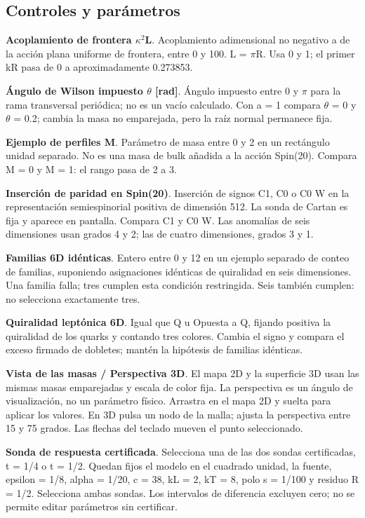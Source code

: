 \documentclass[11pt,a4paper]{article}
\begin{document}
\subsection*{Controles y parámetros}
\textbf{Acoplamiento de frontera \ensuremath{\kappa}\ensuremath{{}^{2}}L}. Acoplamiento adimensional no negativo a de la acción plana uniforme de frontera, entre 0 y 100. L = \ensuremath{\pi}R. Usa 0 y 1; el primer kR pasa de 0 a aproximadamente 0.273853.

\textbf{Ángulo de Wilson impuesto \ensuremath{\theta} [rad]}. Ángulo impuesto entre 0 y \ensuremath{\pi} para la rama transversal periódica; no es un vacío calculado. Con a = 1 compara \ensuremath{\theta} = 0 y \ensuremath{\theta} = 0.2; cambia la masa no emparejada, pero la raíz normal permanece fija.

\textbf{Ejemplo de perfiles M}. Parámetro de masa entre 0 y 2 en un rectángulo unidad separado. No es una masa de bulk añadida a la acción Spin(20). Compara M = 0 y M = 1: el rango pasa de 2 a 3.

\textbf{Inserción de paridad en Spin(20)}. Inserción de signos C1, C0 o C0 W en la representación semiespinorial positiva de dimensión 512. La sonda de Cartan es fija y aparece en pantalla. Compara C1 y C0 W. Las anomalías de seis dimensiones usan grados 4 y 2; las de cuatro dimensiones, grados 3 y 1.

\textbf{Familias 6D idénticas}. Entero entre 0 y 12 en un ejemplo separado de conteo de familias, suponiendo asignaciones idénticas de quiralidad en seis dimensiones. Una familia falla; tres cumplen esta condición restringida. Seis también cumplen: no selecciona exactamente tres.

\textbf{Quiralidad leptónica 6D}. Igual que Q u Opuesta a Q, fijando positiva la quiralidad de los quarks y contando tres colores. Cambia el signo y compara el exceso firmado de dobletes; mantén la hipótesis de familias idénticas.

\textbf{Vista de las masas / Perspectiva 3D}. El mapa 2D y la superficie 3D usan las mismas masas emparejadas y escala de color fija. La perspectiva es un ángulo de visualización, no un parámetro físico. Arrastra en el mapa 2D y suelta para aplicar los valores. En 3D pulsa un nodo de la malla; ajusta la perspectiva entre 15 y 75 grados. Las flechas del teclado mueven el punto seleccionado.

\textbf{Sonda de respuesta certificada}. Selecciona una de las dos sondas certificadas, t = 1/4 o t = 1/2. Quedan fijos el modelo en el cuadrado unidad, la fuente, epsilon = 1/8, alpha = 1/20, c = 38, kL = 2, kT = 8, polo s = 1/100 y residuo R = 1/2. Selecciona ambas sondas. Los intervalos de diferencia excluyen cero; no se permite editar parámetros sin certificar.
\end{document}
